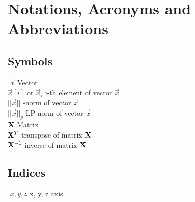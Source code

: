 \chapter*{Notations, Acronyms and Abbreviations}
\label{sec:symbols}

\section*{Symbols}

\begin{tabbing}
 \hspace*{3cm} \= \kill
  $\vec{x}$  \>Vector \\[0.5ex] 					
  $\vec{x}[i]$ or $\vec{x}_i$  \> i-th element of vector $\vec{x}$ \\[0.5ex]
  $||\vec{x}||$ -norm of vector $\vec{x}$\\[0.5ex]	
  $||\vec{x}||_p$ \>LP-norm of vector $\vec{x}$\\[0.5ex]	
  $\mathbf{X}$    \> Matrix \\[0.5ex]
  $\mathbf{X}^T$  \> transpose of matrix  $\mathbf{X}$\\[0.5ex]
  $\mathbf{X}^{-1}$  \> inverse of matrix $\mathbf{X}$ \\[0.5ex]
\end{tabbing}

\section*{Indices}
\begin{tabbing}
 \hspace*{3cm}  \= \kill
 $x, y, z$ \> x, y, z axis \\[0.5ex]
\end{tabbing}

